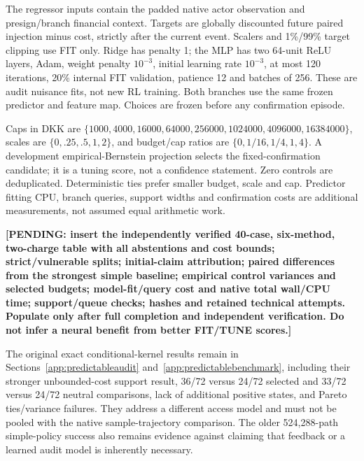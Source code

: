 The regressor inputs contain the padded native actor observation and presign/branch financial context. Targets are globally discounted future paired injection minus cost, strictly after the current event. Scalers and 1\%/99\% target clipping use FIT only. Ridge has penalty 1; the MLP has two 64-unit ReLU layers, Adam, weight penalty $10^{-3}$, initial learning rate $10^{-3}$, at most 120 iterations, 20\% internal FIT validation, patience 12 and batches of 256. These are audit nuisance fits, not new RL training. Both branches use the same frozen predictor and feature map. Choices are frozen before any confirmation episode.

Caps in DKK are $\{1000,4000,16000,64000,256000,1024000,4096000,16384000\}$, scales are $\{0,.25,.5,1,2\}$, and budget/cap ratios are $\{0,1/16,1/4,1,4\}$. A development empirical-Bernstein projection selects the fixed-confirmation candidate; it is a tuning score, not a confidence statement. Zero controls are deduplicated. Deterministic ties prefer smaller budget, scale and cap. Predictor fitting CPU, branch queries, support widths and confirmation costs are additional measurements, not assumed equal arithmetic work.

\textbf{[PENDING: insert the independently verified 40-case, six-method, two-charge table with all abstentions and cost bounds; strict/vulnerable splits; initial-claim attribution; paired differences from the strongest simple baseline; empirical control variances and selected budgets; model-fit/query cost and native total wall/CPU time; support/queue checks; hashes and retained technical attempts. Populate only after full completion and independent verification. Do not infer a neural benefit from better FIT/TUNE scores.]}

The original exact conditional-kernel results remain in Sections~\ref{app:predictableaudit} and~\ref{app:predictablebenchmark}, including their stronger unbounded-cost support result, 36/72 versus 24/72 selected and 33/72 versus 24/72 neutral comparisons, lack of additional positive states, and Pareto ties/variance failures. They address a different access model and must not be pooled with the native sample-trajectory comparison. The older 524,288-path simple-policy success also remains evidence against claiming that feedback or a learned audit model is inherently necessary.
